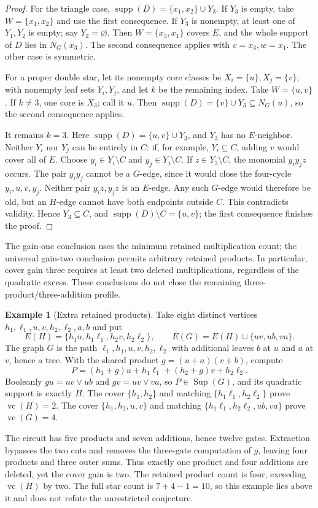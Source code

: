 \documentclass[11pt]{article}
\newcommand{\supp}{\operatorname{supp}}
\newcommand{\Sup}{\operatorname{Sup}}
\newcommand{\vc}{\operatorname{vc}}
\theoremstyle{definition}
\newtheorem{example}[theorem]{Example}
\theoremstyle{remark}
\begin{document}
\begin{proof}
For the triangle case, $\supp(D)=\{x_1,x_2\}\cup Y_3$. If $Y_3$ is empty, take $W=\{x_1,x_2\}$ and use the first consequence. If $Y_3$ is nonempty, at least one of $Y_1,Y_2$ is empty; say $Y_2=\varnothing$. Then $W=\{x_3,x_1\}$ covers $E$, and the whole support of $D$ lies in $N_G(x_3)$. The second consequence applies with $v=x_3,w=x_1$. The other case is symmetric.

For a proper double star, let its nonempty core classes be $X_i=\{u\},X_j=\{v\}$, with nonempty leaf sets $Y_i,Y_j$, and let $k$ be the remaining index. Take $W=\{u,v\}$. If $k\ne3$, one core is $X_3$; call it $u$. Then $\supp(D)=\{v\}\cup Y_3\subseteq N_G(u)$, so the second consequence applies.

It remains $k=3$. Here $\supp(D)=\{u,v\}\cup Y_3$, and $Y_3$ has no $E$-neighbor. Neither $Y_i$ nor $Y_j$ can lie entirely in $C$: if, for example, $Y_i\subseteq C$, adding $v$ would cover all of $E$. Choose $y_i\in Y_i\setminus C$ and $y_j\in Y_j\setminus C$. If $z\in Y_3\setminus C$, the monomial $y_iy_jz$ occurs. The pair $y_iy_j$ cannot be a $G$-edge, since it would close the four-cycle $y_i,u,v,y_j$. Neither pair $y_iz,y_jz$ is an $E$-edge. Any such $G$-edge would therefore be old, but an $H$-edge cannot have both endpoints outside $C$. This contradicts validity. Hence $Y_3\subseteq C$, and $\supp(D)\setminus C=\{u,v\}$; the first consequence finishes the proof.
\end{proof}

The gain-one conclusion uses the minimum retained multiplication count; the universal gain-two conclusion permits arbitrary retained products. In particular, cover gain three requires at least two deleted multiplications, regardless of the quadratic excess. These conclusions do not close the remaining three-product/three-addition profile.

\begin{example}[Extra retained products]\label{ex:oneproductnonminimal}
Take eight distinct vertices $h_1,\ell_1,u,v,h_2,\ell_2,a,b$ and put
\[
 E(H)=\{h_1u,h_1\ell_1,h_2v,h_2\ell_2\},\qquad
 E(G)=E(H)\cup\{uv,ub,va\}.
\]
The graph $G$ is the path $\ell_1,h_1,u,v,h_2,\ell_2$ with additional leaves $b$ at $u$ and $a$ at $v$, hence a tree. With the shared product $g=(u+a)(v+b)$, compute
\[
 P=(h_1+g)u+h_1\ell_1+(h_2+g)v+h_2\ell_2.
\]
Booleanly $gu=uv\vee ub$ and $gv=uv\vee va$, so $P\in\Sup(G)$, and its quadratic support is exactly $H$. The cover $\{h_1,h_2\}$ and matching $\{h_1\ell_1,h_2\ell_2\}$ prove $\vc(H)=2$. The cover $\{h_1,h_2,u,v\}$ and matching $\{h_1\ell_1,h_2\ell_2,ub,va\}$ prove $\vc(G)=4$.

The circuit has five products and seven additions, hence twelve gates. Extraction bypasses the two cuts and removes the three-gate computation of $g$, leaving four products and three outer sums. Thus exactly one product and four additions are deleted, yet the cover gain is two. The retained product count is four, exceeding $\vc(H)$ by two. The full star count is $7+4-1=10$, so this example lies above it and does not refute the unrestricted conjecture.
\end{example}
\end{document}
